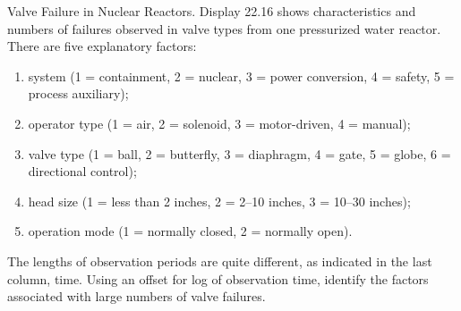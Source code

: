 \documentclass[10pt,letterpaper]{article}
\begin{document}
Valve Failure in Nuclear Reactors. Display 22.16 shows characteristics and numbers of failures
observed in valve types from one pressurized water reactor. There are five explanatory factors:
\begin{enumerate}[leftmargin=0cm,itemindent=.5cm,labelwidth=\itemindent,labelsep=0cm,align=left]
\item[\textbullet] system (1 = containment, 2 = nuclear, 3 = power conversion, 4 = safety, 5 = process auxiliary);
\item[\textbullet] operator type (1 = air, 2 = solenoid, 3 = motor-driven, 4 = manual); 
\item[\textbullet] valve type (1 = ball, 2 = butterfly, 3 = diaphragm, 4 = gate, 5 = globe, 6 = directional control); 
\item[\textbullet] head size (1 = less than 2 inches, 2 = 2–10 inches, 3 = 10–30 inches); 
\item[\textbullet] operation mode (1 = normally closed, 2 = normally open). 
\end{enumerate}
The lengths of observation periods are quite different, as indicated in the last column, time. Using an offset for log of observation time, identify the factors associated with large numbers
of valve failures.
\end{document}
